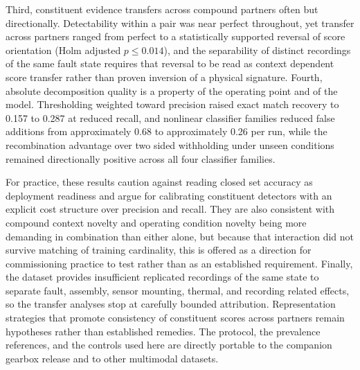 Third, constituent evidence transfers across compound partners often but
directionally. Detectability within a pair was near perfect throughout, yet
transfer across partners ranged from perfect to a statistically supported
reversal of score orientation (Holm adjusted $p \le 0.014$), and the
separability of distinct recordings of the same fault state requires that
reversal to be read as context dependent score transfer rather than proven
inversion of a physical signature. Fourth, absolute
decomposition quality is a property of the operating point and of the model.
Thresholding weighted toward precision raised exact match recovery to 0.157
to 0.287 at reduced recall, and nonlinear classifier families
reduced false additions from approximately 0.68 to approximately 0.26 per
run, while the recombination advantage over two sided withholding under
unseen conditions remained directionally positive across all four classifier
families.

For practice, these results caution against reading closed set accuracy as
deployment readiness and argue for calibrating constituent detectors with an
explicit cost structure over precision and recall. They are also consistent
with compound context novelty and operating condition novelty being more
demanding in combination than either alone, but because that interaction did
not survive matching of training cardinality, this is offered as a direction
for commissioning practice to test rather than as an established requirement.
Finally, the dataset provides insufficient replicated recordings of the same
state to separate fault, assembly, sensor mounting, thermal, and recording
related effects, so the transfer analyses stop at carefully bounded
attribution. Representation strategies that promote consistency of
constituent scores across partners remain hypotheses rather than established
remedies. The protocol, the prevalence references, and the controls used here
are directly portable to the companion gearbox release and to other
multimodal datasets.
